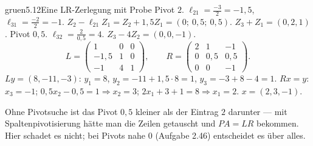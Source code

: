 \begin{loesungkarte}{gruen}{5.12}{Eine LR-Zerlegung mit Probe}
Pivot $2$. $\ell_{21} = \frac{-3}2 = -1{,}5$, $\ell_{31} = \frac{-2}2 = -1$. $Z_2 - \ell_{21}Z_1 = Z_2 + 1{,}5Z_1 = (0;\ 0{,}5;\ 0{,}5)$. $Z_3 + Z_1 = (0, 2, 1)$.
Pivot $0{,}5$. $\ell_{32} = \frac2{0{,}5} = 4$. $Z_3 - 4Z_2 = (0, 0, -1)$.
\[ L = \begin{pmatrix}1 & 0 & 0\\ -1{,}5 & 1 & 0\\ -1 & 4 & 1\end{pmatrix},\qquad R = \begin{pmatrix}2 & 1 & -1\\ 0 & 0{,}5 & 0{,}5\\ 0 & 0 & -1\end{pmatrix}. \]
$Ly = (8, -11, -3)$: $y_1 = 8$, $y_2 = -11 + 1{,}5\cdot8 = 1$, $y_3 = -3 + 8 - 4 = 1$. $Rx = y$: $x_3 = -1$; $0{,}5x_2 - 0{,}5 = 1\Rightarrow x_2 = 3$; $2x_1 + 3 + 1 = 8\Rightarrow x_1 = 2$. $x = (2, 3, -1)$.
\begin{mitnehmen}\kastentext
Ohne Pivotsuche ist das Pivot $0{,}5$ kleiner als der Eintrag $2$ darunter --- mit Spaltenpivotisierung hätte man die Zeilen getauscht und $PA = LR$ bekommen. Hier schadet es nicht; bei Pivots nahe $0$ (Aufgabe 2.46) entscheidet es über alles.
\end{mitnehmen}
\end{loesungkarte}

